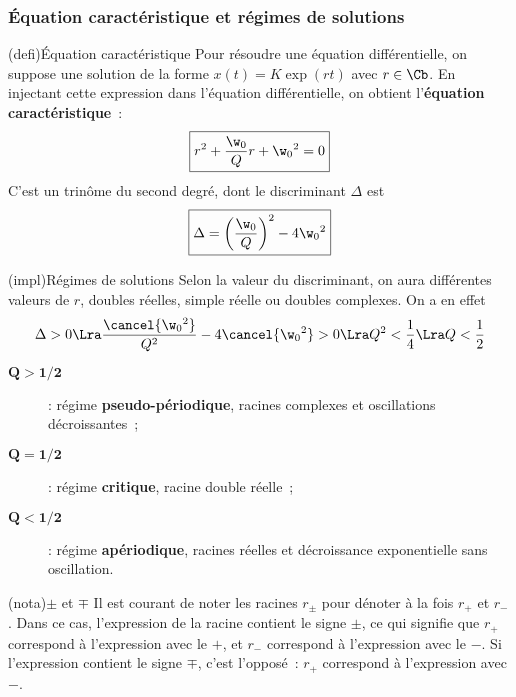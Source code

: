 \documentclass[../../main/main.tex]{subfiles}
\begin{document}
\subsubsection{Équation caractéristique et régimes de solutions}
\begin{tcbraster}[raster columns=2, raster equal height=rows]
	\begin{tcb}[label=def:eqcarac](defi){Équation caractéristique}
		Pour résoudre une équation différentielle, on suppose une solution de la
		forme $x(t) = K\exp(rt)$ avec $r \in \Cb$. En injectant cette
		expression dans l'équation différentielle, on obtient l'\textbf{équation
			caractéristique}~:
		\begin{equation*}
			\boxed{r^2 + \frac{\w_0}{Q}r + \w_0{}^2 = 0}
		\end{equation*}
		C'est un trinôme du second degré, dont le discriminant $\Delta$ est
		\begin{equation*}
			\boxed{\Delta = \left( \frac{\w_0}{Q} \right)^2 - 4\w_0{}^2}
		\end{equation*}
	\end{tcb}
	\begin{tcb}[label=impl:eqcarac](impl){Régimes de solutions}
		Selon la valeur du discriminant, on aura différentes valeurs de $r$,
		doubles réelles, simple réelle ou doubles complexes. On a en effet
		\begin{gather*}
			\Delta > 0
			\Lra
			\frac{\cancel{\w_0{}^2}}{Q^2} - 4\cancel{\w_0{}^2} > 0
			\Lra
			Q^2 < \frac{1}{4}
			\Lra
			Q < \frac{1}{2}
		\end{gather*}
		\begin{description}
			\item[$\mathbf{Q > 1/2}$] : régime \textbf{pseudo-périodique},
				racines complexes et oscillations décroissantes~;
			\item[$\mathbf{Q = 1/2}$] : régime \textbf{critique}, racine double
				réelle~;
			\item[$\mathbf{Q < 1/2}$] : régime \textbf{apériodique}, racines
				réelles et décroissance exponentielle sans oscillation.
		\end{description}
	\end{tcb}
\end{tcbraster}

\begin{tcb}[label=nota:pm](nota){$\pm$ et $\mp$}
	Il est courant de noter les racines $r_\pm$ pour dénoter à la fois $r_+$ et
	$r_-$. Dans ce cas, l'expression de la racine contient le signe $\pm$, ce
	qui signifie que $r_+$ correspond à l'expression avec le $+$, et $r_-$
	correspond à l'expression avec le $-$. Si l'expression contient le signe
	$\mp$, c'est l'opposé~: $r_+$ correspond à l'expression avec $-$.
\end{tcb}
\end{document}
